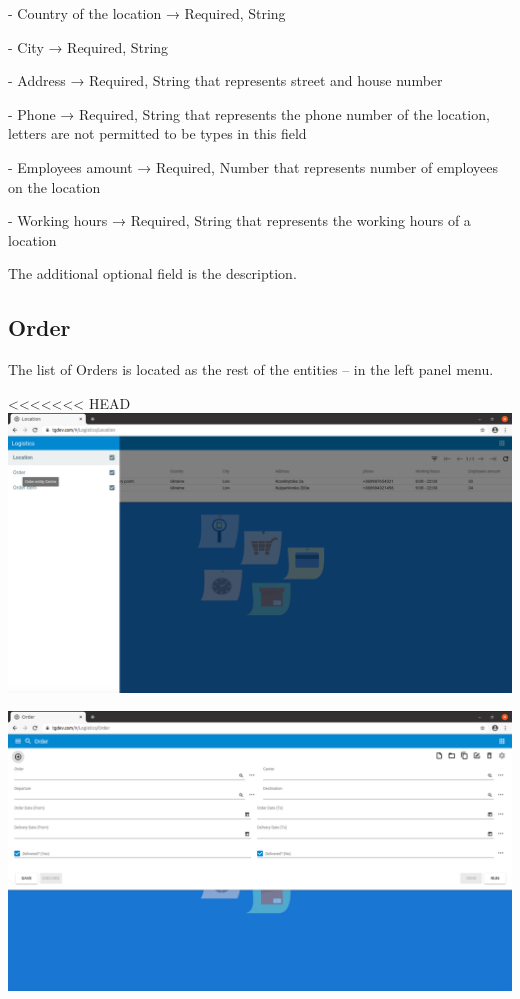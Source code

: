 - Country of the location → Required, String

- City → Required, String

- Address → Required, String that represents street and house number

- Phone → Required, String that represents the phone number of the location, letters are not permitted to be types in this field

- Employees amount → Required, Number that represents number of employees on the location

- Working hours → Required, String that represents the working hours of a location

The additional optional field is the description.


\subsection{Order}

The list of Orders is located as the rest of the entities -- in the left panel menu. 

<<<<<<< HEAD
\includegraphics[width=\textwidth]{sections/01-chapter/images/order11.png}


\includegraphics[width=\textwidth]{sections/01-chapter/images/order12.png}

